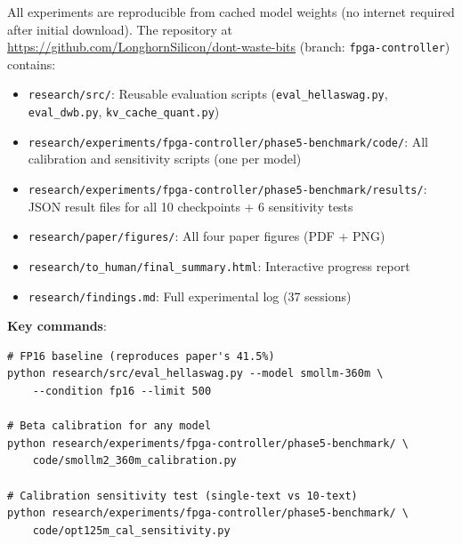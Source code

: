 \documentclass{article}
\begin{document}
All experiments are reproducible from cached model weights (no internet required after initial download). The repository at \url{https://github.com/LonghornSilicon/dont-waste-bits} (branch: \texttt{fpga-controller}) contains:

\begin{itemize}
\item \texttt{research/src/}: Reusable evaluation scripts (\texttt{eval\_hellaswag.py}, \texttt{eval\_dwb.py}, \texttt{kv\_cache\_quant.py})
\item \texttt{research/experiments/fpga-controller/phase5-benchmark/code/}: All calibration and sensitivity scripts (one per model)
\item \texttt{research/experiments/fpga-controller/phase5-benchmark/results/}: JSON result files for all 10 checkpoints + 6 sensitivity tests
\item \texttt{research/paper/figures/}: All four paper figures (PDF + PNG)
\item \texttt{research/to\_human/final\_summary.html}: Interactive progress report
\item \texttt{research/findings.md}: Full experimental log (37 sessions)
\end{itemize}

\textbf{Key commands}:
\begin{verbatim}
# FP16 baseline (reproduces paper's 41.5%)
python research/src/eval_hellaswag.py --model smollm-360m \
    --condition fp16 --limit 500

# Beta calibration for any model
python research/experiments/fpga-controller/phase5-benchmark/ \
    code/smollm2_360m_calibration.py

# Calibration sensitivity test (single-text vs 10-text)
python research/experiments/fpga-controller/phase5-benchmark/ \
    code/opt125m_cal_sensitivity.py
\end{verbatim}



\end{document}
